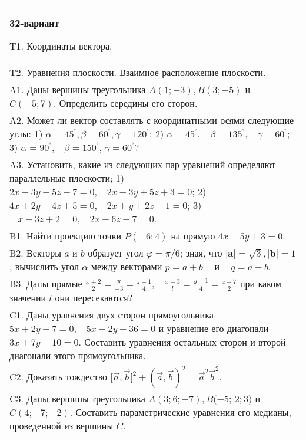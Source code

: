 \documentclass{article}
\begin{document}
\begin{tabular}{m{17cm}}
\textbf{32-вариант}
\newline

T1. 
Координаты вектора.
 \\
T2. 
Уравнения плоскости. Взаимное расположение плоскости.
 \\
A1. 
Даны вершины треугольника \(A(1; - 3),B(3; - 5)\) и \(C( - 5;7)\). Определить середины его сторон.
 \\
A2. Может ли вектор составлять с координатными осями следующие углы: 1) \(\alpha = 45^{{^\circ}},\beta = 60^{{^\circ}},\gamma = 120^{{^\circ}}\); 2) \(\alpha = 45^{{^\circ}},\ \ \ \ \beta = 135^{{^\circ}},\ \ \ \ \gamma = 60^{{^\circ}}\); 3) \(\alpha = 90^{{^\circ}},\ \ \ \ \beta = 150^{{^\circ}}\), \(\gamma = 60^{{^\circ}}?\)
 \\
A3. 
Установить, какие из следующих пар уравнений определяют параллельные плоскости; 1) \(2x - 3y + 5z - 7 = 0,\ \ \ \ 2x - 3y + 5z + 3 = 0\); 2) \(4x + 2y - 4z + 5 = 0,\ \ \ \ 2x + y + 2z - 1 = 0\); 3) \(\ \ \ \ x - 3z + 2 = 0,\ \ \ \ 2x - 6z - 7 = 0\).
 \\
B1. 
Найти проекцию точки \(P( - 6;4)\) на прямую \(4x - 5y + 3 = 0\).
 \\
B2. 
Векторы \(a\) и \(b\) образует угол \(\varphi = \pi/6\); зная, что \(|\mathbf{a}| = \sqrt{3},|\mathbf{b}| = 1\), вычислить угол \(\alpha\) между векторами \(p = a + b\ \ \ \ \) и \(\ \ \ \ q = a - b\).
 \\
B3. 
Даны прямые \(\frac{x + 2}{2} = \frac{y}{- 3} = \frac{z - 1}{4},\ \ \ \ \frac{x - 3}{l} = \frac{y - 1}{4} = \frac{z - 7}{2}\) при каком значении \(l\) они пересекаются?
 \\
C1. 
Даны уравнения двух сторон прямоугольника \(5x + 2y - 7 = 0,\ \ \ \ 5x + 2y - 36 = 0\) и уравнение его диагонали \(3x + 7y - 10 = 0\). Составить уравнения остальных сторон и второй диагонали этого прямоугольника.
 \\
C2. 
Доказать тождество \(\lbrack\overrightarrow{a},\overrightarrow{b}\rbrack^{2} + (\overrightarrow{a},\overrightarrow{b})^{2} = {\overrightarrow{a}}^{2}{\overrightarrow{b}}^{2}\).
 \\
C3. 
Даны вершины треугольника \(A(3;6; - 7),B( - 5\); \(2;3)\) и \(C(4; - 7; - 2)\). Составить параметрические уравнения его медианы, проведенной из вершины \(C\).
 \\

\end{tabular}
\vspace{1cm}
\end{document}
